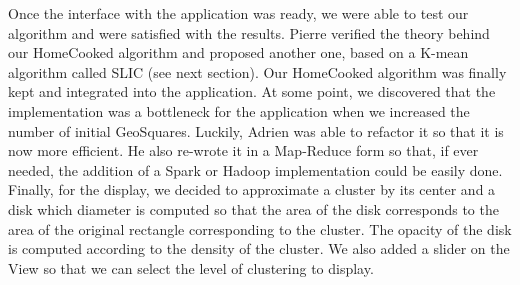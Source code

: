 Once the interface with the application was ready, we were able to test our algorithm and were satisfied with the results. 
Pierre verified the theory behind our HomeCooked algorithm and proposed another one, based on a K-mean algorithm called SLIC (see next section).
Our HomeCooked algorithm was finally kept and integrated into the application. At some point, we discovered that the implementation was a bottleneck for the application when we increased the number of initial GeoSquares. Luckily, Adrien was able to refactor it so that it is now more efficient. He also re-wrote it in a Map-Reduce form so that, if ever needed, the addition of a Spark or Hadoop implementation could be easily done. 
Finally, for the display, we decided to approximate a cluster by its center and a disk which diameter is computed so that the area of the disk corresponds to the area of the original rectangle corresponding to the cluster. The opacity of the disk is computed according to the density of the cluster. We also added a slider on the View so that we can select the level of clustering to display. 